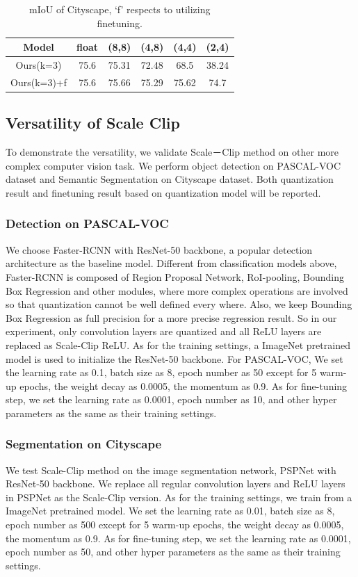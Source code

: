\documentclass[letterpaper]{article} %
\begin{document}
\begin{table}
	\caption{mIoU of Cityscape, `f' respects to utilizing finetuning.}
    \label{tab:miou}
	\begin{tabular}{cccccc}
		\hline
		Model  & float  &  (8,8) & (4,8) & (4,4) & (2,4) \\
		\hline
        Ours(k=3)  & 75.6 & 75.31  & 72.48 & 68.5 & 38.24 \\
        Ours(k=3)+f & 75.6 & 75.66 & 75.29 & 75.62 & 74.7 \\
		\hline
	\end{tabular}
\end{table}

\subsection{Versatility of Scale Clip}
To demonstrate the versatility, we validate Scale－Clip method on other more complex computer vision task. We perform object detection on PASCAL-VOC dataset and Semantic Segmentation on Cityscape dataset. Both quantization result and finetuning result based on quantization model will be reported. 

\subsubsection{Detection on PASCAL-VOC}
We choose Faster-RCNN with ResNet-50 backbone, a popular detection architecture as the baseline model.
Different from classification models above, Faster-RCNN is composed of Region Proposal Network, RoI-pooling, Bounding Box Regression and other modules, where more complex operations are involved so that quantization cannot be well defined every where. Also, we keep Bounding Box Regression as full precision for a more precise regression result. So in our experiment, only convolution layers are quantized and all ReLU layers are replaced as Scale-Clip ReLU. As for the training settings, a ImageNet pretrained model is used to initialize the ResNet-50 backbone. For PASCAL-VOC, We set the learning rate as 0.1, batch size as 8, epoch number as 50 except for 5 warm-up epochs, the weight decay as 0.0005, the momentum as 0.9. As for fine-tuning step, we set the learning rate as 0.0001, epoch number as 10, and other hyper parameters as the same as their training settings.

\subsubsection{Segmentation on Cityscape}
We test Scale-Clip method on the image segmentation network, PSPNet with ResNet-50 backbone.
We replace all regular convolution layers and ReLU layers in PSPNet as the Scale-Clip version. As for the training settings, we train from a ImageNet pretrained model. We set the learning rate as 0.01, batch size as 8, epoch number as 500 except for 5 warm-up epochs, the weight decay as 0.0005, the momentum as 0.9. As for fine-tuning step, we set the learning rate as 0.0001, epoch number as 50, and other hyper parameters as the same as their training settings. 
\end{document}
